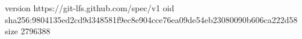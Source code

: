 version https://git-lfs.github.com/spec/v1
oid sha256:9804135ed2cd9d348581f9ec8e904cce76ea09de54eb23080090b606ca222d58
size 2796388
